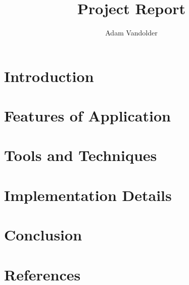 \documentclass{article}
\title{Project Report}
\author{Adam Vandolder}
\date{}
\begin{document}
	\maketitle
    \tableofcontents
	\newpage

    \section{Introduction}
    \section{Features of Application}
    \section{Tools and Techniques}
    \section{Implementation Details}
    \section{Conclusion}
    \section{References}
\end{document}

